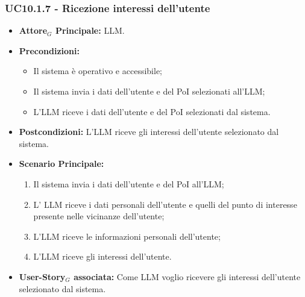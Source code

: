 \documentclass[11pt]{article}
\begin{document}
\begin{justify}
\subsubsection{\textbf{UC10.1.7 - Ricezione interessi dell'utente}}
\begin{itemize}
    \item \textbf{Attore$_G$ Principale:} LLM.
    \item \textbf{Precondizioni:} 
        \begin{itemize}
          \item Il sistema è operativo e accessibile;
          \item Il sistema invia i dati dell'utente e del PoI selezionati all'LLM;
            \item L'LLM riceve i dati dell'utente e del PoI selezionati dal sistema.
        \end{itemize}
      \item \textbf{Postcondizioni:} L'LLM riceve gli interessi dell'utente selezionato dal sistema.
    \item \textbf{Scenario Principale:} 
        \begin{enumerate}
          \item Il sistema invia i dati dell'utente e del PoI all'LLM;
        \item L' LLM riceve i dati personali dell'utente e quelli del punto di interesse presente nelle vicinanze dell'utente;
          \item L'LLM riceve le informazioni personali dell'utente;
          \item L'LLM riceve gli interessi dell'utente.
        \end{enumerate}
      \item \textbf{User-Story$_G$ associata:} Come LLM voglio ricevere gli interessi dell'utente selezionato dal sistema.
\end{itemize}

\end{justify}
\end{document}
